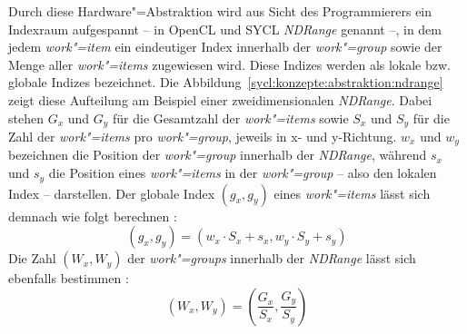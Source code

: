 Durch diese Hardware"=Abstraktion wird aus Sicht des Programmierers ein
Indexraum aufgespannt -- in OpenCL und SYCL \textit{NDRange} genannt --, in dem
jedem \textit{work"=item} ein eindeutiger Index innerhalb der
\textit{work"=group} sowie der Menge aller \textit{work"=items} zugewiesen wird.
Diese Indizes werden als lokale bzw. globale Indizes bezeichnet. Die
Abbildung~\ref{sycl:konzepte:abstraktion:ndrange} zeigt diese Aufteilung am
Beispiel einer zweidimensionalen \textit{NDRange}. Dabei stehen $G_x$ und 
$G_y$ für die Gesamtzahl der \textit{work"=items} sowie $S_x$ und $S_y$ für die
Zahl der \textit{work"=items} pro \textit{work"=group}, jeweils in x- und
y-Richtung. $w_x$ und $w_y$ bezeichnen die Position der \textit{work"=group}
innerhalb der \textit{NDRange}, während $s_x$ und $s_y$ die Position eines
\textit{work"=items} in der \textit{work"=group} -- also den lokalen Index --
darstellen. Der globale Index $(g_x, g_y)$ eines \textit{work"=items} lässt sich
demnach wie folgt berechnen \cite[vgl.][24]{opencl2012}:
\[
    (g_x, g_y) = (w_x \cdot S_x + s_x, w_y \cdot S_y + s_y)
\]
Die Zahl $(W_x, W_y)$ der \textit{work"=groups} innerhalb der \textit{NDRange}
lässt sich ebenfalls bestimmen \cite[vgl.][25]{opencl2012}:
\[
    (W_x, W_y) = \left(\frac{G_x}{S_x}, \frac{G_y}{S_y}\right)
\]

